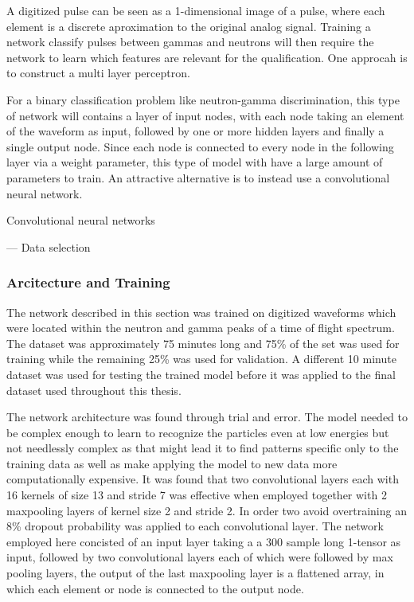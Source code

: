 \documentclass[main.tex]{subfiles}
\begin{document}
A digitized pulse can be seen as a 1-dimensional image of a pulse, where each element is a discrete aproximation to the original analog signal. Training a network classify pulses between gammas and neutrons will then require the network to learn which features are relevant for the qualification. One approcah is to construct a multi layer perceptron. 

For a binary classification problem like neutron-gamma discrimination, this type of network will contains a layer of input nodes, with each node taking an element of the waveform as input, followed by one or more hidden layers and finally a single output node. Since each node is connected to every node in the following layer via a weight parameter, this type of model with have a large amount of parameters to train. An attractive alternative is to instead use a convolutional neural network.

Convolutional neural networks
\cite{Goodfellow-et-al-2016}

---
Data selection

\subsubsection{Arcitecture and Training}
The network described in this section was trained on digitized waveforms which were located within the neutron and gamma peaks of a time of flight spectrum. The dataset was approximately 75 minutes long and 75\% of the set was used for training while the remaining 25\% was used for validation. A different 10 minute dataset was used for testing the trained model before it was applied to the final dataset used throughout this thesis. 

The network architecture was found through trial and error. The model needed to be complex enough to learn to recognize the particles even at low energies but not needlessly complex as that might lead it to find patterns specific only to the training data as well as make applying the model to new data more computationally expensive. It was found that two convolutional layers each with 16 kernels of size 13 and stride 7 was effective when employed together with 2 maxpooling layers of kernel size 2 and stride 2. In order two avoid overtraining an 8\% dropout probability was applied to each convolutional layer.
The network employed here concisted of an input layer taking a a 300 sample long 1-tensor as input, followed by two convolutional layers each of which were followed by max pooling layers, the output of the last maxpooling layer is a flattened array, in which each element or node is connected to the output node.
\end{document}
